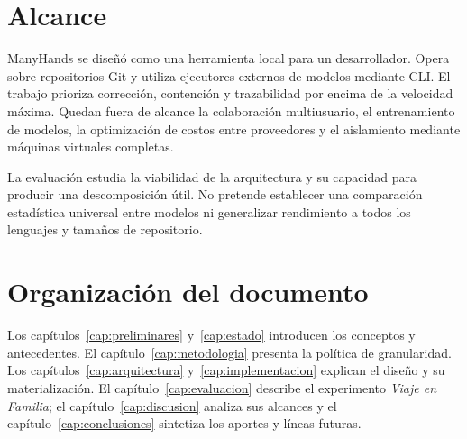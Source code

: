 \section{Alcance}

ManyHands se diseñó como una herramienta local para un desarrollador. Opera
sobre repositorios Git y utiliza ejecutores externos de modelos mediante CLI.
El trabajo prioriza corrección, contención y trazabilidad por encima de la
velocidad máxima. Quedan fuera de alcance la colaboración multiusuario, el
entrenamiento de modelos, la optimización de costos entre proveedores y el
aislamiento mediante máquinas virtuales completas.

La evaluación estudia la viabilidad de la arquitectura y su capacidad para
producir una descomposición útil. No pretende establecer una comparación
estadística universal entre modelos ni generalizar rendimiento a todos los
lenguajes y tamaños de repositorio.

\section{Organización del documento}

Los capítulos~\ref{cap:preliminares} y~\ref{cap:estado} introducen los conceptos
y antecedentes. El capítulo~\ref{cap:metodologia} presenta la política de
granularidad. Los capítulos~\ref{cap:arquitectura} y~\ref{cap:implementacion}
explican el diseño y su materialización. El capítulo~\ref{cap:evaluacion}
describe el experimento \emph{Viaje en Familia}; el
capítulo~\ref{cap:discusion} analiza sus alcances y el
capítulo~\ref{cap:conclusiones} sintetiza los aportes y líneas futuras.
